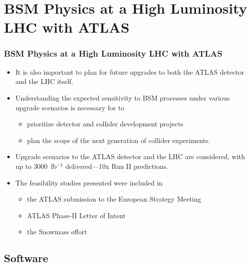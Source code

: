 \section{BSM Physics at a High Luminosity LHC with ATLAS}

\begin{frame}
\frametitle{BSM Physics at a High Luminosity LHC with ATLAS}
\begin{itemize}
    \item It is also important to plan for future upgrades to both the
        ATLAS detector and the LHC itself.
    \item Understanding the expected sensitivity to BSM processes under
        various upgrade scenarios is necessary for to
    \begin{itemize}
            \item prioritize detector and collider development
                projects
            \item plan the scope of the next generation of collider
                experiments.
    \end{itemize}

    \item Upgrade scenarios to the ATLAS detector and the LHC are
        considered, with up to 3000~fb$^{-1}$ delivered---10x Run II
        predictions.

\item The feasibility studies presented were included in
    \begin{itemize}
    \item the ATLAS submission to the European Strategy Meeting
    \item ATLAS Phase-II Letter of Intent
    \item the Snowmass effort
    \end{itemize}
\end{itemize}
\end{frame}

\subsection{Software}

